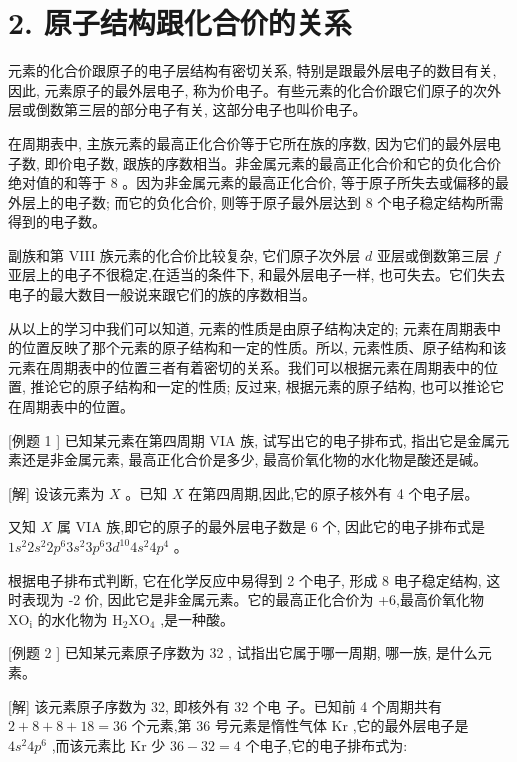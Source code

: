 \documentclass[10pt]{article}
\begin{document}
\section*{2. 原子结构跟化合价的关系}

元素的化合价跟原子的电子层结构有密切关系, 特别是跟最外层电子的数目有关, 因此, 元素原子的最外层电子, 称为价电子。有些元素的化合价跟它们原子的次外层或倒数第三层的部分电子有关, 这部分电子也叫价电子。

在周期表中, 主族元素的最高正化合价等于它所在族的序数, 因为它们的最外层电子数, 即价电子数, 跟族的序数相当。非金属元素的最高正化合价和它的负化合价绝对值的和等于 8 。因为非金属元素的最高正化合价, 等于原子所失去或偏移的最外层上的电子数; 而它的负化合价, 则等于原子最外层达到 8 个电子稳定结构所需得到的电子数。

副族和第 VIII 族元素的化合价比较复杂, 它们原子次外层 \(d\) 亚层或倒数第三层 \(f\) 亚层上的电子不很稳定,在适当的条件下, 和最外层电子一样, 也可失去。它们失去电子的最大数目一般说来跟它们的族的序数相当。

从以上的学习中我们可以知道, 元素的性质是由原子结构决定的; 元素在周期表中的位置反映了那个元素的原子结构和一定的性质。所以, 元素性质、原子结构和该元素在周期表中的位置三者有着密切的关系。我们可以根据元素在周期表中的位置, 推论它的原子结构和一定的性质; 反过来, 根据元素的原子结构, 也可以推论它在周期表中的位置。

[例题 1 ] 已知某元素在第四周期 VIA 族, 试写出它的电子排布式, 指出它是金属元素还是非金属元素, 最高正化合价是多少, 最高价氧化物的水化物是酸还是碱。

[解] 设该元素为 \(X\) 。已知 \(X\) 在第四周期,因此,它的原子核外有 4 个电子层。

又知 \(X\) 属 VIA 族,即它的原子的最外层电子数是 6 个, 因此它的电子排布式是 \(1{s}^{2}2{s}^{2}2{p}^{6}3{s}^{2}3{p}^{6}3{d}^{10}4{s}^{2}4{p}^{4}\) 。

根据电子排布式判断, 它在化学反应中易得到 2 个电子, 形成 8 电子稳定结构, 这时表现为 -2 价, 因此它是非金属元素。它的最高正化合价为 +6,最高价氧化物 \({\mathrm{{XO}}}_{\mathrm{i}}\) 的水化物为 \({\mathrm{H}}_{2}{\mathrm{{XO}}}_{4}\) ,是一种酸。

[例题 2 ] 已知某元素原子序数为 32 , 试指出它属于哪一周期, 哪一族, 是什么元素。

[解] 该元素原子序数为 32, 即核外有 32 个电 子。已知前 4 个周期共有 \(2 + 8 + 8 + {18} = {36}\) 个元素,第 36 号元素是惰性气体 \(\mathrm{{Kr}}\) ,它的最外层电子是 \(4{s}^{2}4{p}^{6}\) ,而该元素比 \(\mathrm{{Kr}}\) 少 \({36} - {32} = 4\) 个电子,它的电子排布式为:
\end{document}
